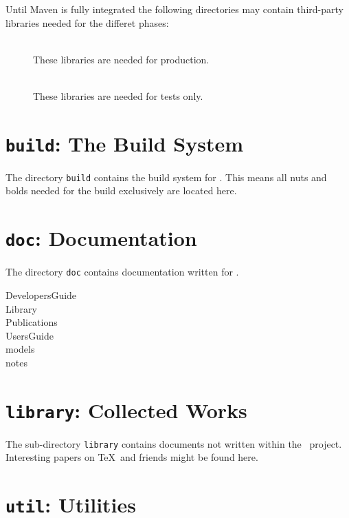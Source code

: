 Until Maven is fully integrated the following directories may contain
third-party libraries needed for the differet phases:

\begin{description}
\item[] \ \\
  These libraries are needed for production.
\item[] \ \\
  These libraries are needed for tests only.
\end{description}


\section{\texttt{build}: The Build System}

The directory \texttt{build} contains the build system for \ExTeX.
This means all nuts and bolds needed for the build exclusively are
located here.


\section{\texttt{doc}: Documentation}

The directory \texttt{doc} contains documentation written for \ExTeX.

\begin{description}
\item[DevelopersGuide] 
\item[Library] 
\item[Publications] 
\item[UsersGuide] 
\item[models] 
\item[notes] 
\end{description}


\section{\texttt{library}: Collected Works}

The sub-directory \texttt{library} contains documents not written
within the \ExTeX\ project. Interesting papers on \TeX\ and friends
might be found here.



\section{\texttt{util}: Utilities}

